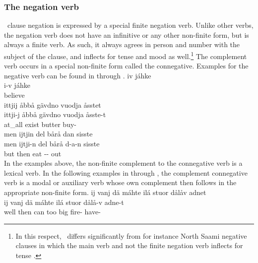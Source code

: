 \subsubsection{The negation verb}\label{negation}
\PS\ clause negation is expressed by a special finite negation verb. Unlike other verbs, the negation verb does not have an infinitive or any other non-finite form, but is always a finite verb. As such, it always agrees in person and number with the subject of the clause, and inflects for tense and mood as well.\footnote{In this respect, \PS\ differs significantly from for instance North Saami negative clauses in which the main verb and not the finite negation verb inflects for tense \citep[cf.][92]{Svonni2009}.} 
The complement verb occurs in a special non-finite form called the connegative.
Examples for the negative verb can be found in  through . 
\ea\label{negation1}%
\glll	iv jáhke\\
	i-v jáhke\\
	 believe\BS{} \\\nopagebreak
{} 
\z
\ea\label{negation2}%
\glll	ittjij åbbå gävdno vuodja åsstet\\
	ittji-j åbbå gävdno vuodja åsste-t\\
	 at\_all exist\BS{} butter\BS{} buy-\\\nopagebreak
{} 
\z
\ea\label{negation3}%
\glll	men ijtjin del bårå dan sisste \\
	men ijtji-n del bårå d-a-n sisste \\
	but  then eat\BS{} -- out\\\nopagebreak
{} 
\z
In the examples above, the non-finite complement to the connegative verb is a lexical verb. In the following examples in  through , the complement connegative verb is a modal or auxiliary verb whose own complement then follows in the appropriate non-finite form.
\ea\label{negation4}%
\glll	ij vanj dä máhte ilá stuor dålåv adnet\\
	ij vanj dä máhte ilá stuor dålå-v adne-t\\
	\BS{} well then can\BS{} too big fire- have-\\\nopagebreak
